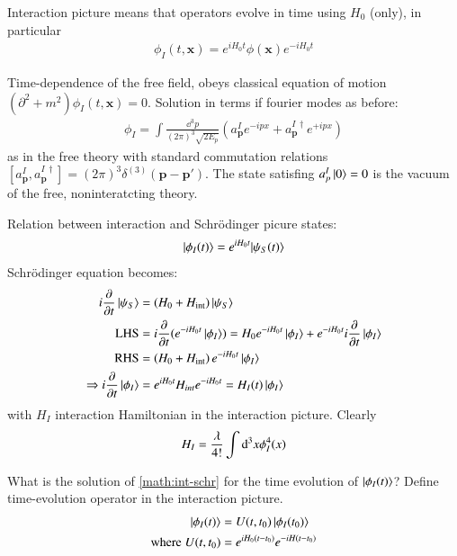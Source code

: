 Interaction picture means that operators evolve in time using $H_0$ (only), in particular 
\begin{align}
	\phi_I(t,\pmb{x}) = e^{iH_0t}\phi(\pmb{x})e^{-iH_0t}
\end{align}

Time-dependence of the free field, obeys classical equation of motion $\left(\partial^2+m^2 \right)\phi_I(t,\pmb{x}) = 0$. Solution in terms if fourier modes as before:
\begin{align}
	\phi_I = \int \frac{\dd^3 p}{(2\pi)^3\sqrt{2E_p}} (a^I_{\pmb{p}}e^{-ipx} + a^{I\,\dagger}_{\pmb{p}}e^{+ipx})
\end{align}
as in the free theory with standard commutation relations $[a^I_{\pmb{p}}, a^{I\,\dagger}_{\pmb{p}}] = (2\pi)^3\delta^{(3)}(\pmb{p}-\pmb{p}')$. The state satisfing $a^I_p \ket{0} = 0$ is the vacuum of the free, noninteratcting theory.

Relation between interaction and Schrödinger picure states:
\begin{align}
	\ket{\phi_I(t)} = e^{iH_0t}{\ket{\psi_S(t)}}
\end{align}
Schrödinger equation becomes: 
\begin{align}
	i\frac{\partial}{\partial t}\ket{\psi_S} &= (H_0 + H_\text{int})\ket{\psi_S} \notag\\
	\text{LHS} &= i \frac{\partial}{\partial t} ( e^{-iH_0t}\ket{\phi_I}) = H_0 e^{-iH_0t}\ket{\phi_I} + e^{-iH_0t}i\frac{\partial}{\partial t}\ket{\phi_I} \notag\\
	\text{RHS}														&= \left(H_0 + H_\text{int}\right)e^{-iH_0t}\ket{\phi_I} \notag\\
	\Rightarrow i\frac{\partial}{\partial t}\ket{\phi_I} &= e^{iH_0t}H_{int} e^{-iH_0t} = H_I(t)\ket{\phi_I} \label{math:int-schr}
\end{align}
with $H_I$ interaction Hamiltonian in the interaction picture. Clearly
\begin{align}
	H_I = \frac{\lambda}{4!}\int\dd^3x\phi_I^4(x) \notag
\end{align}

What is the solution of \ref{math:int-schr} for the time evolution of $\ket{\phi_I(t)}$? Define time-evolution operator in the interaction picture.
\begin{align}
	\ket{\phi_I(t)} &= U(t,t_0)\ket{\phi_I(t_0)}\label{math:int-schr2}\\
	\text{where} \; U(t,t_0) &= e^{iH_0(t-t_0)}e^{-iH(t-t_0)} 
\end{align}

